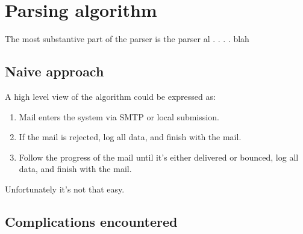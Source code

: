 \documentclass[a4paper,12pt,draft]{article}
\begin{document}
\section{Parsing algorithm}

The most substantive part of the parser is the parser al . . . . blah



\subsection{Naive approach}

A high level view of the algorithm could be expressed as:

\begin{enumerate}

    \item Mail enters the system via SMTP or local submission.

    \item If the mail is rejected, log all data, and finish with the mail.

    \item Follow the progress of the mail until it's either delivered or
        bounced, log all data, and finish with the mail.

\end{enumerate}

Unfortunately it's not that easy.


\subsection{Complications encountered}
\end{document}
